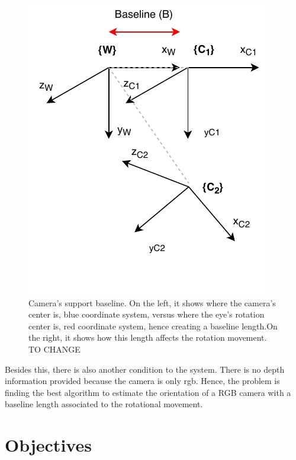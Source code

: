 \begin{figure}[ht]
\begin{minipage}[b]{0.2\linewidth}
	\end{minipage}
	\hspace{0.5cm}
	\begin{minipage}[b]{0.3\linewidth}
		\centering
		\includegraphics[width=\textwidth]{images/transf.pdf}
	\end{minipage}
	\caption[Camera's support baseline]{Camera's support baseline. On the left, it shows where the camera's center is, blue coordinate system, versus where the eye's rotation center is, red coordinate system, hence creating a baseline length.On the right, it shows how this length affects the rotation movement. TO CHANGE}
	\label{cha1:sec1:fig:baseline}
\end{figure}

Besides this, there is also another condition to the system. There is no depth information provided because the camera is only \acrshort{rgb}. Hence, the problem is finding the best algorithm to estimate the orientation of a RGB camera with a baseline length associated to the rotational movement.

\section{Objectives}
\label{cha1:objectives}

